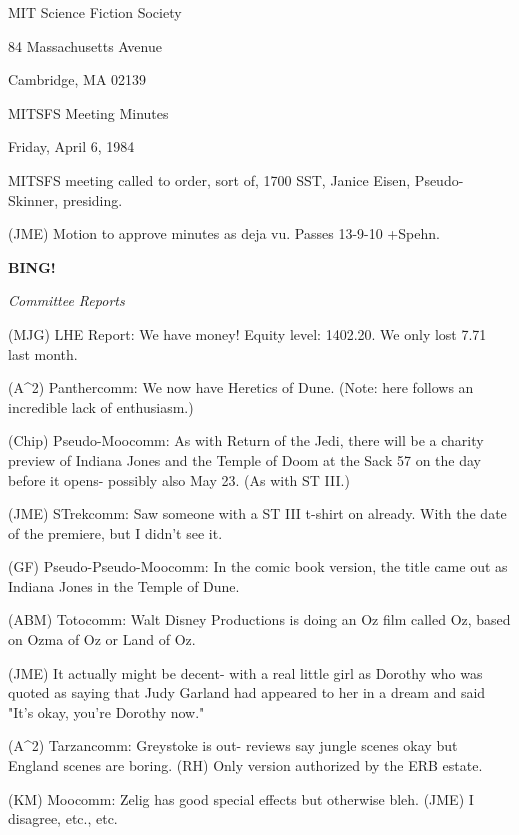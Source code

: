 \documentclass[12pt]{article}
\newcommand{\bing}{{\bf BING!} }
\newcommand{\goto}[1]{\bing \vskip 12pt \centerline{{\em{#1}}}}
\begin{document}
\begin{center}

MIT Science Fiction Society 

84 Massachusetts Avenue

Cambridge, MA 02139

\vspace{12pt}

MITSFS Meeting Minutes 

Friday, April 6, 1984

\end{center}
 
\vspace{18pt}

\setlength{\parskip}{6pt}

\noindent
MITSFS meeting called to order, sort of, 1700 SST,
Janice Eisen, Pseudo-Skinner, presiding.

(JME) Motion to approve minutes as deja vu. Passes 13-9-10 +Spehn.

\goto{Committee Reports}

(MJG) LHE Report: We have money! Equity level: 1402.20. We only lost 7.71 last month.

(A^2) Panthercomm: We now have Heretics of Dune. (Note: here follows an incredible lack of enthusiasm.)

(Chip) Pseudo-Moocomm: As with Return of the Jedi, there will be a charity preview of Indiana Jones and the Temple of Doom at the Sack 57 on the day before it opens- possibly also May 23. (As with ST III.)

(JME) STrekcomm: Saw someone with a ST III t-shirt on already. With the date of the premiere, but I didn't see it.

(GF) Pseudo-Pseudo-Moocomm: In the comic book version, the title came out as Indiana Jones in the Temple of Dune.

(ABM) Totocomm: Walt Disney Productions is doing an Oz film called Oz, based on Ozma of Oz or Land of Oz.

(JME) It actually might be decent- with a real little girl as Dorothy who was quoted as saying that Judy Garland had appeared to her in a dream and said "It's okay, you're Dorothy now."

(A^2) Tarzancomm: Greystoke is out- reviews say jungle scenes okay but England scenes are boring. (RH) Only version authorized by the ERB estate.

(KM) Moocomm: Zelig has good special effects but otherwise bleh. (JME) I disagree, etc., etc.
\end{document}
